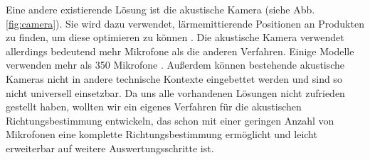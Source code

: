   Eine andere existierende Lösung ist die akustische Kamera (siehe Abb. \ref{fig:camera}). Sie wird dazu verwendet, lärmemittierende Positionen an Produkten zu finden, um diese optimieren zu können \cite{camera}. Die akustische Kamera verwendet allerdings bedeutend mehr Mikrofone als die anderen Verfahren. Einige Modelle verwenden mehr als 350 Mikrofone \cite{nmics}. Außerdem können bestehende akustische Kameras nicht in andere technische Kontexte eingebettet werden und sind so nicht universell einsetzbar. Da uns alle vorhandenen Lösungen nicht zufrieden gestellt haben, wollten wir ein eigenes Verfahren für die akustischen Richtungsbestimmung entwickeln, das schon mit einer geringen Anzahl von Mikrofonen eine komplette Richtungsbestimmung ermöglicht und leicht erweiterbar auf weitere Auswertungsschritte ist.
